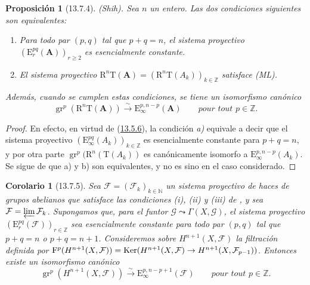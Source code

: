 \documentclass[10pt,oneside,openany]{book}
\theoremstyle{egaenv}\newtheorem*{env}{---}
\theoremstyle{egastatement}
\newtheorem*{proposition}{Proposición}
\newtheorem*{corollary}{Corolario}
\theoremstyle{egadescription}
\renewcommand{\geq}{\geqslant}
\renewcommand{\to}{\mathchoice{\longrightarrow}{\rightarrow}{\rightarrow}{\rightarrow}}
\begin{document}
\begin{proposition}[13.7.4]
\label{0.13.7.4}
\label{0.13.7.4-fr}
(Shih).
Sea $n$ un entero.
Las dos condiciones siguientes son equivalentes:
\begin{enumerate}
  \item[{\rm a)}] Para todo par $(p,q)$ tal que $p+q=n$, el
  sistema proyectivo
  $(\mathrm E_r^{pq}(\mathbf A))_{r\geq2}$ es esencialmente constante.
  \item[{\rm b)}] El sistema proyectivo
  $\mathrm R^n\mathrm T(\mathbf A)=
(\mathrm R^n\mathrm T(A_k))_{k\in\mathbb Z}$ satisface \textup{(ML)}.
\end{enumerate}
Además, cuando se cumplen estas condiciones, se tiene un isomorfismo canónico
\begin{equation}
\label{0.13.7.4.1-fr}
\tag{13.7.4.1}
\operatorname{gr}^p(\mathrm R^n\mathrm T(\mathbf A))
\xrightarrow{\sim}\mathrm E_\infty^{p,n-p}(\mathbf A)
\qquad\textit{pour tout $p\in\mathbb Z$.}
\end{equation}
\end{proposition}
\begin{proof}
En efecto, en virtud de (\hyperref[0.13.5.6-fr]{13.5.6}), la condición \emph{a)} equivale a decir que el sistema proyectivo $(\mathrm E_\infty^{pq}(A_k))_{k\in\mathbb Z}$ es esencialmente constante para $p+q=n$, y por otra parte
$\operatorname{gr}^p(\mathrm R^n(\mathrm T(A_k))$ es canónicamente isomorfo a
$\mathrm E_\infty^{p,n-p}(A_k)$.
Se sigue de  que {\rm a)} y {\rm b)} son
equivalentes, y  no es sino
 en el caso considerado.
\end{proof}

\begin{corollary}[13.7.5]
\label{0.13.7.5}
\label{0.13.7.5-fr}
Sea $\boldsymbol{\mathcal F}=(\mathcal F_k)_{k\in\mathbb N}$ un sistema proyectivo de
haces de grupos abelianos que satisface las condiciones {\rm(i)}, {\rm(ii)}
y {\rm(iii)} de , y sea
$\mathcal F=\varprojlim\mathcal F_k$.
Supongamos que, para el funtor
$\mathcal G\leadsto\Gamma(X,\mathcal G)$, el sistema proyectivo $(\mathrm E_r^{pq}(\boldsymbol{\mathcal F}))_{r\in\mathbb Z}$ sea esencialmente constante para todo par $(p,q)$ tal que $p+q=n$ o $p+q=n+1$. Consideremos sobre $H^{n+1}(X,\mathcal F)$ la filtración definida por $\mathrm F^p(H^{n+1}(X,\mathcal F))=
\operatorname{Ker}(H^{n+1}(X,\mathcal F)\to
H^{n+1}(X,\mathcal F_{p-1}))$.
Entonces existe un isomorfismo canónico
\begin{equation}
\label{0.13.7.5.1-fr}
\tag{13.7.5.1}
\operatorname{gr}^p(H^{n+1}(X,\mathcal F))
\xrightarrow{\sim}\mathrm E_\infty^{p,n-p+1}(\boldsymbol{\mathcal F})
\qquad\textit{pour tout $p\in\mathbb Z$.}
\end{equation}
\end{corollary}
\end{document}

